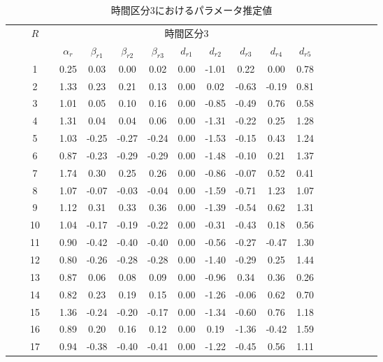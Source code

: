 \documentclass[a4paper,11pt,oneside,openany]{jsbook}
\newcommand{\bhline}[1]{\noalign{\hrule height #1}}
\begin{document}
\begin{table}[h!]
\begin{center}
\caption{時間区分3におけるパラメータ推定値}
\setlength{\tabcolsep}{5.pt}
\begin{tabular}{ccccccccccccccccccc}  
\bhline{1pt}
& & \multirow{2}{*}{$R$} & & \multicolumn{9}{c}{時間区分3}    \\
\cline{5-13}
  & &  & & $\alpha_r$ & $\beta_{r1}$ & $\beta_{r2}$ & $\beta_{r3}$ & $d_{r1}$ &  $d_{r2}$ & $d_{r3}$ & $d_{r4}$ & $d_{r5}$  \\
\bhline{1pt}
 &  & 1  &  & 0.25 & 0.03  & 0.00  & 0.02  & 0.00 & -1.01 & 0.22  & 0.00  & 0.78 \\
 &  & 2  &  & 1.33 & 0.23  & 0.21  & 0.13 & 0.00 & 0.02  & -0.63 & -0.19 & 0.81 \\
 &  & 3  &  & 1.01 & 0.05  & 0.10  & 0.16  & 0.00 & -0.85 & -0.49 & 0.76  & 0.58 \\
 &  & 4  &  & 1.31 & 0.04  & 0.04  & 0.06  & 0.00 & -1.31 & -0.22 & 0.25  & 1.28 \\
 &  & 5  &  & 1.03 & -0.25 & -0.27 & -0.24 & 0.00 & -1.53 & -0.15 & 0.43  & 1.24 \\
 &  & 6  &  & 0.87 & -0.23 & -0.29 & -0.29 & 0.00 & -1.48 & -0.10 & 0.21  & 1.37 \\
 &  & 7  &  & 1.74 & 0.30  & 0.25  & 0.26  & 0.00 & -0.86 & -0.07 & 0.52  & 0.41 \\
 &  & 8  &  & 1.07 & -0.07 & -0.03 & -0.04 & 0.00 & -1.59 & -0.71 & 1.23  & 1.07 \\
 &  & 9  &  & 1.12 & 0.31  & 0.33  & 0.36  & 0.00 & -1.39 & -0.54 & 0.62  & 1.31 \\
 &  & 10 &  & 1.04 & -0.17 & -0.19 & -0.22 & 0.00 & -0.31 & -0.43 & 0.18  & 0.56 \\
 &  & 11 &  & 0.90 & -0.42 & -0.40 & -0.40 & 0.00 & -0.56 & -0.27 & -0.47 & 1.30 \\
 &  & 12 &  & 0.80 & -0.26 & -0.28 & -0.28 & 0.00 & -1.40 & -0.29 & 0.25  & 1.44 \\
 &  & 13 &  & 0.87 & 0.06  & 0.08  & 0.09  & 0.00 & -0.96 & 0.34  & 0.36  & 0.26 \\
 &  & 14 &  & 0.82 & 0.23  & 0.19  & 0.15  & 0.00 & -1.26 & -0.06 & 0.62  & 0.70 \\
 &  & 15 &  & 1.36 & -0.24 & -0.20 & -0.17 & 0.00 & -1.34 & -0.60 & 0.76  & 1.18 \\
 &  & 16 &  & 0.89 & 0.20  & 0.16  & 0.12  & 0.00 & 0.19  & -1.36 & -0.42 & 1.59 \\
 &  & 17 &  & 0.94 & -0.38 & -0.40 & -0.41 & 0.00 & -1.22 & -0.45 & 0.56  & 1.11 \\

\end{tabular}
\end{center}
\end{table}
\end{document}
